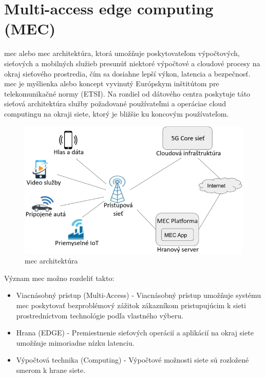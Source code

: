 \section{Multi-access edge computing (MEC)}

\acrlong{mec} alebo \acrshort{mec} architektúra, ktorá umožňuje poskytovateľom výpočtových, sieťových a mobilných služieb presunúť niektoré výpočtové a cloudové procesy na okraj sieťového prostredia, čím sa dosiahne lepší výkon, latencia a bezpečnosť.
\acrfull{mec} je myšlienka alebo koncept vyvinutý Európskym inštitútom pre telekomunikačné normy (ETSI).
Na rozdiel od dátového centra poskytuje táto sieťová architektúra služby požadované používateľmi a operáciae cloud computingu na okraji siete, ktorý je bližšie ku koncovým používateľom. \cite{mec}

\begin{figure}[H]
    \centering
    \includegraphics[width=1\linewidth]{figures/MEC.png}
    \caption{\acrfull{mec} architektúra \label{mec}}
    \label{fig:enter-label}
\end{figure}

Význam \acrshort{mec} možno rozdeliť takto:

\begin{itemize}

    \item Viacnásobný prístup (Multi-Access) - Viacnásobný prístup umožňuje systému \acrshort{mec} poskytovať bezproblémový zážitok zákazníkom pristupujúcim k sieti prostredníctvom technológie podľa vlastného výberu.
    \item Hrana (EDGE) - Premiestnenie sieťových operácií a aplikácií na okraj siete umožňuje mimoriadne nízku latenciu.
    \item Výpočtová technika (Computing) - Výpočtové možnosti siete sú rozložené smerom k hrane siete.

\end{itemize}

